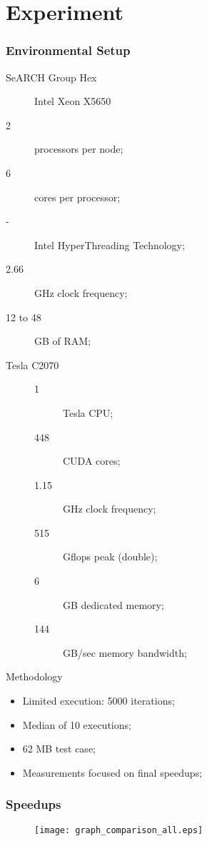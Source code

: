 \section{Experiment}


\begin{frame}
	\frametitle{Environmental Setup}

	\begin{block}{SeARCH Group Hex}
		\begin{description}
			\item [] Intel\textsuperscript{\textregistered} Xeon\textsuperscript{\textregistered} X5650
			\item [2] processors per node;
			\item [6] cores per processor;
			\item [-] Intel\textsuperscript{\textregistered} HyperThreading Technology;
			\item [2.66] GHz clock frequency;
			\item [12 to 48] GB of RAM;
			\item [Tesla C2070]
			\begin{description}
				\item [1] Tesla CPU;
				\item [448] CUDA cores;
				\item [1.15] GHz clock frequency;
				\item [515] Gflops peak (double);
				\item [6] GB dedicated memory;
				\item [144] GB/sec memory bandwidth;
			\end{description}
		\end{description}
	\end{block}
\end{frame}

\begin{frame}{Methodology}
	\begin{itemize}
		\vfill
		\item Limited execution: 5000 iterations;
		\vfill
		\item Median of 10 executions;
		\vfill
		\item 62 MB test case;
		\vfill
		\item Measurements focused on final speedups;
		\vfill
	\end{itemize}
\end{frame}

\begin{frame}
	\frametitle{Speedups}
	\begin{figure}
		\centering
		\texttt{[image: graph\_comparison\_all.eps]}
	\end{figure}
\end{frame}
